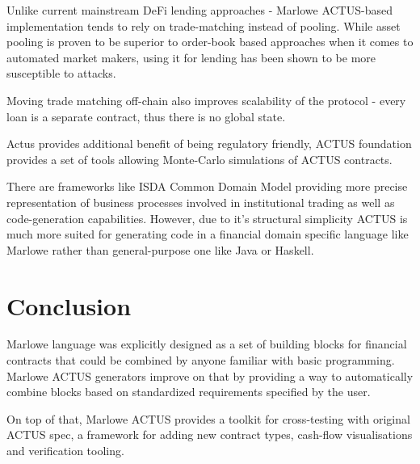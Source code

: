 \documentclass[runningheads]{llncs}
\begin{document}


Unlike current mainstream DeFi lending approaches - Marlowe ACTUS-based
implementation tends to rely on trade-matching instead of pooling.
While asset pooling is proven to be superior to order-book based approaches
when it comes to automated market makers, using it for lending has
been shown to be more susceptible to attacks\cite{flash-loan}.

Moving trade matching off-chain also improves scalability of the protocol
- every loan is a separate contract, thus there is no global state.

Actus provides additional benefit of being regulatory friendly, ACTUS
foundation provides a set of tools allowing Monte-Carlo simulations
of ACTUS contracts.

There are frameworks like ISDA Common Domain Model \cite{isda-cdm} providing 
more precise representation of business processes involved in institutional trading 
as well as code-generation capabilities. However, due to it's structural simplicity ACTUS 
is much more suited for generating code in a financial domain specific language 
like Marlowe rather than general-purpose one like Java or Haskell.

\section{Conclusion}
\label{conclusion}

Marlowe language was explicitly designed as a set of building blocks
for financial contracts that could be combined by anyone familiar
with basic programming. Marlowe ACTUS generators improve on that by
providing a way to automatically combine blocks based on standardized
requirements specified by the user.

On top of that, Marlowe ACTUS provides a toolkit for cross-testing
with original ACTUS spec, a framework for adding new contract types,
cash-flow visualisations and verification tooling.

%
%
%


%
\end{document}
